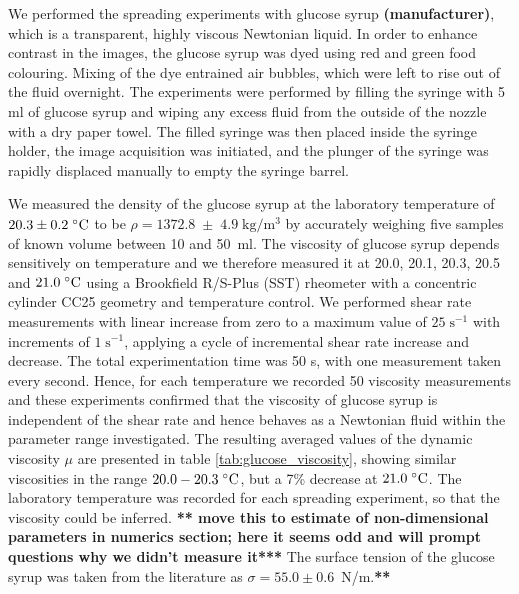 \documentclass[aip,graphicx]{revtex4-1}
\newcommand{\sym}[1]{\text{#1}} \newcommand{\dif}{\mathrm{d}}
\begin{document}
We performed the spreading experiments with glucose syrup {\bf
  (manufacturer)}, which is a transparent, highly viscous Newtonian
liquid. In order to enhance contrast in the images, the glucose syrup
was dyed using red and green food colouring.  Mixing of the dye
entrained air bubbles, which were left to rise out of the fluid
overnight. The experiments were performed by filling the syringe with
5 ml of glucose syrup and wiping any excess fluid from the outside of
the nozzle with a dry paper towel. The filled syringe was then placed
inside the syringe holder, the image acquisition was initiated, and
the plunger of the syringe was rapidly displaced manually to empty the
syringe barrel.

We measured the density of the glucose syrup at the laboratory temperature
of $20.3 \pm 0.2 \; ^{\circ} \text{C}$ to be $\rho=1372.8 \; \pm \; 4.9 \;
\sym{kg}/\sym{m}^3$ by accurately weighing five samples of known
volume between 10 and 50~ml.  The viscosity of glucose syrup depends
sensitively on temperature \cite{llewellin2002rheology} and we
therefore measured it at 20.0, 20.1, 20.3, 20.5 and $21.0 \; ^{\circ} \text{C}$
using a Brookfield R/S-Plus (SST) rheometer with a concentric cylinder
CC25 geometry and temperature control. We performed shear rate
measurements with linear increase from zero to a maximum value of $25
\; \sym{s}^{-1}$ with increments of $1 \; \sym{s}^{-1}$, applying a
cycle of incremental shear rate increase and decrease.  The total
experimentation time was 50 s, with one measurement taken every
second. Hence, for each temperature we recorded 50 viscosity
measurements and these experiments confirmed that the viscosity of
glucose syrup is independent of the shear rate and hence behaves as a
Newtonian fluid within the parameter range investigated. The resulting
averaged values of the dynamic viscosity $\mu$ are presented in table
\ref{tab:glucose_viscosity}, showing similar viscosities in the range
$20.0 - 20.3 \; ^{\circ} \text{C}$, but a 7\% decrease at $21.0 \; ^{\circ} \text{C}$. The
laboratory temperature was recorded for each spreading experiment, so
that the viscosity could be inferred. {\bf ***  move this to
  estimate of non-dimensional parameters in numerics section; here it
  seems odd and will prompt questions why we didn't measure it***}
The surface tension of the glucose syrup was taken from the 
literature \cite{montanez2013influence} as $\sigma=55.0 \pm 0.6$~N/m.{\bf ***}
\end{document}
